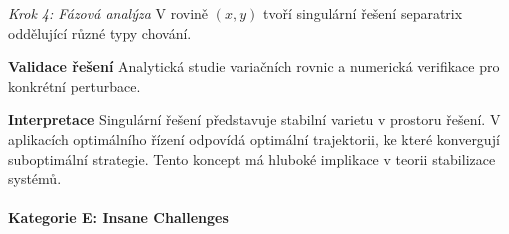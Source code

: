 \begin{example}
\vspace{1\baselineskip}

\noindent\textit{Krok 4: Fázová analýza}
V rovině $(x, y)$ tvoří singulární řešení separatrix oddělující různé typy chování.

\vspace{1.5\baselineskip}

\noindent\textbf{Validace řešení}
Analytická studie variačních rovnic a numerická verifikace pro konkrétní perturbace.

\vspace{1.5\baselineskip}

\noindent\textbf{Interpretace}
Singulární řešení představuje stabilní varietu v prostoru řešení. V aplikacích optimálního řízení odpovídá optimální trajektorii, ke které konvergují suboptimální strategie. Tento koncept má hluboké implikace v teorii stabilizace systémů.

\end{example}

\paragraph*{Kategorie E: Insane Challenges}

